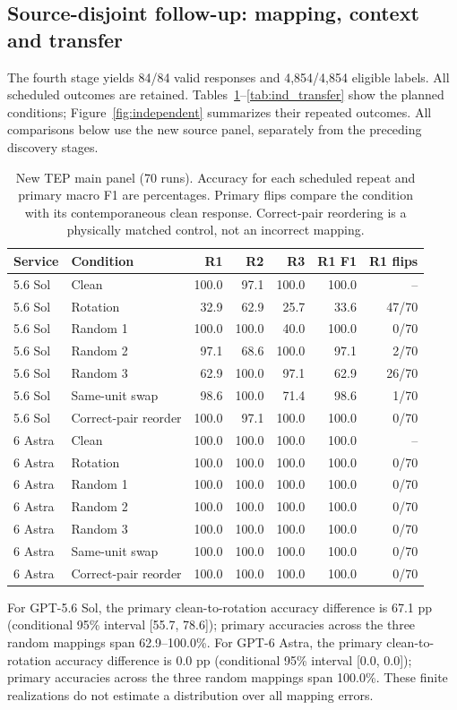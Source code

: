 \documentclass[11pt,a4paper]{article}
\begin{document}
\FloatBarrier

\subsection{Source-disjoint follow-up: mapping, context and transfer}
The fourth stage yields 84/84 valid responses and 4,854/4,854 eligible labels. All scheduled outcomes are retained. Tables~\ref{tab:ind_mapping}--\ref{tab:ind_transfer} show the planned conditions; Figure~\ref{fig:independent} summarizes their repeated outcomes. All comparisons below use the new source panel, separately from the preceding discovery stages.

\begin{table}[htbp]
\centering
\small
\caption{New TEP main panel (70 runs). Accuracy for each scheduled repeat and primary macro F1 are percentages. Primary flips compare the condition with its contemporaneous clean response. Correct-pair reordering is a physically matched control, not an incorrect mapping.}
\label{tab:ind_mapping}
\begin{tabular}{@{}llrrrrr@{}}
\toprule
Service & Condition & R1 & R2 & R3 & R1 F1 & R1 flips \\
\midrule
5.6 Sol & Clean & 100.0 & 97.1 & 100.0 & 100.0 & -- \\
5.6 Sol & Rotation & 32.9 & 62.9 & 25.7 & 33.6 & 47/70 \\
5.6 Sol & Random 1 & 100.0 & 100.0 & 40.0 & 100.0 & 0/70 \\
5.6 Sol & Random 2 & 97.1 & 68.6 & 100.0 & 97.1 & 2/70 \\
5.6 Sol & Random 3 & 62.9 & 100.0 & 97.1 & 62.9 & 26/70 \\
5.6 Sol & Same-unit swap & 98.6 & 100.0 & 71.4 & 98.6 & 1/70 \\
5.6 Sol & Correct-pair reorder & 100.0 & 97.1 & 100.0 & 100.0 & 0/70 \\
6 Astra & Clean & 100.0 & 100.0 & 100.0 & 100.0 & -- \\
6 Astra & Rotation & 100.0 & 100.0 & 100.0 & 100.0 & 0/70 \\
6 Astra & Random 1 & 100.0 & 100.0 & 100.0 & 100.0 & 0/70 \\
6 Astra & Random 2 & 100.0 & 100.0 & 100.0 & 100.0 & 0/70 \\
6 Astra & Random 3 & 100.0 & 100.0 & 100.0 & 100.0 & 0/70 \\
6 Astra & Same-unit swap & 100.0 & 100.0 & 100.0 & 100.0 & 0/70 \\
6 Astra & Correct-pair reorder & 100.0 & 100.0 & 100.0 & 100.0 & 0/70 \\
\bottomrule
\end{tabular}
\end{table}
For GPT-5.6 Sol, the primary clean-to-rotation accuracy difference is 67.1 pp (conditional 95\% interval [55.7, 78.6]); primary accuracies across the three random mappings span 62.9--100.0\%. For GPT-6 Astra, the primary clean-to-rotation accuracy difference is 0.0 pp (conditional 95\% interval [0.0, 0.0]); primary accuracies across the three random mappings span 100.0\%. These finite realizations do not estimate a distribution over all mapping errors.
\end{document}
